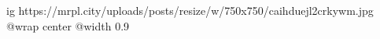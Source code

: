  
 
 
 
 

\ifcmt
  ig https://mrpl.city/uploads/posts/resize/w/750x750/caihduejl2crkywm.jpg
  @wrap center
  @width 0.9
\fi
